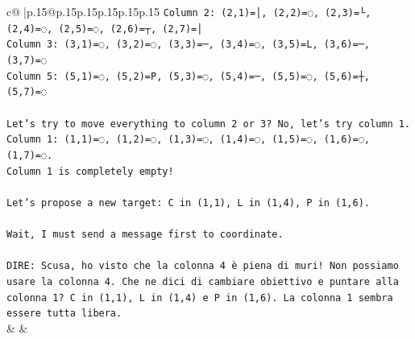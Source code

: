 \documentclass{article}
\begin{document}
{\begin{supertabular}{c@{$\;$}|p{.15\linewidth}@{}p{.15\linewidth}p{.15\linewidth}p{.15\linewidth}p{.15\linewidth}p{.15\linewidth}}
{{{\texttt{Column 2: (2,1)=│, (2,2)=◌, (2,3)=└, (2,4)=◌, (2,5)=◌, (2,6)=┬, (2,7)=│} \\
\texttt{Column 3: (3,1)=◌, (3,2)=◌, (3,3)=─, (3,4)=◌, (3,5)=L, (3,6)=─, (3,7)=◌} \\
\texttt{Column 5: (5,1)=◌, (5,2)=P, (5,3)=◌, (5,4)=─, (5,5)=◌, (5,6)=┼, (5,7)=◌} \\
\\ 
\texttt{Let's try to move everything to column 2 or 3? No, let's try column 1.} \\
\texttt{Column 1: (1,1)=◌, (1,2)=◌, (1,3)=◌, (1,4)=◌, (1,5)=◌, (1,6)=◌, (1,7)=◌.} \\
\texttt{Column 1 is completely empty!} \\
\\ 
\texttt{Let's propose a new target: C in (1,1), L in (1,4), P in (1,6).} \\
\\ 
\texttt{Wait, I must send a message first to coordinate.} \\
\\ 
\texttt{DIRE: Scusa, ho visto che la colonna 4 è piena di muri! Non possiamo usare la colonna 4. Che ne dici di cambiare obiettivo e puntare alla colonna 1? C in (1,1), L in (1,4) e P in (1,6). La colonna 1 sembra essere tutta libera.} \\
            }
        }
    }
    & & \\ \\


\end{supertabular}}
\end{document}
